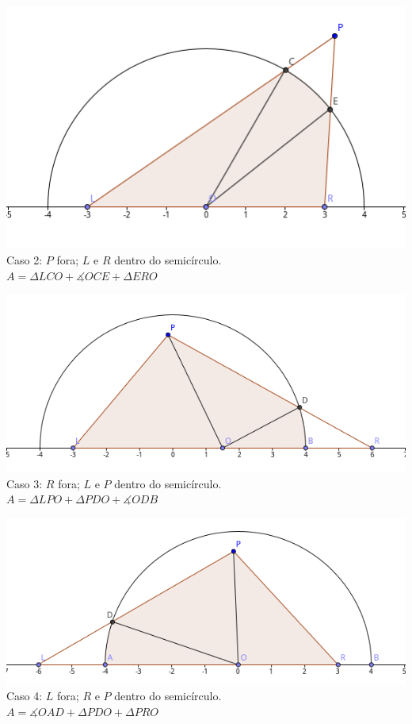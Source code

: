 \begin{center}
    \includegraphics[scale=1.7]{arremesso/editorial-imgs/caso2.png}\\
    Caso 2: $P$ fora; $L$ e $R$ dentro do semicírculo.\\$A = \Delta LCO + \measuredangle OCE + \Delta ERO$
\end{center}

\begin{center}
    \includegraphics[scale=1.7]{arremesso/editorial-imgs/caso3.png}\\
    Caso 3: $R$ fora; $L$ e $P$ dentro do semicírculo.\\$A = \Delta LPO + \Delta PDO + \measuredangle ODB$
\end{center}

\begin{center}
    \includegraphics[scale=1.7]{arremesso/editorial-imgs/caso4.png}\\
    Caso 4: $L$ fora; $R$ e $P$ dentro do semicírculo.\\$A = \measuredangle OAD + \Delta PDO + \Delta PRO$
\end{center}


